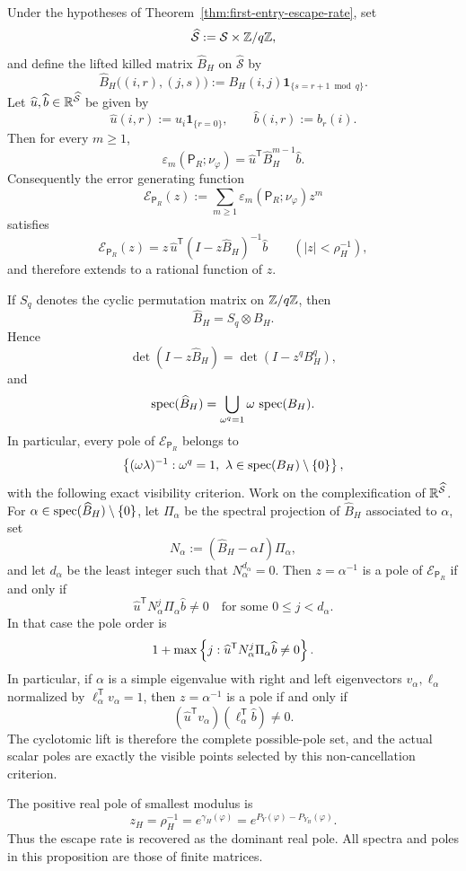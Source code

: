 \begin{proposition}
\label{thm:error-resolvent-cyclotomic}
\label{thm:main-resonance}
Under the hypotheses of
Theorem~\ref{thm:first-entry-escape-rate}, set
\[
  \widehat{\mathcal S}:=\mathcal S\times \mathbb{Z}/q\mathbb{Z},
\]
and define the lifted killed matrix \(\widehat B_H\) on
\(\widehat{\mathcal S}\) by
\[
  \widehat B_H\bigl((i,r),(j,s)\bigr)
  := B_H(i,j)\mathbf{1}_{\{s=r+1\bmod q\}}.
\]
Let \(\widehat u,\widehat b\in\mathbb{R}^{\widehat{\mathcal S}}\) be given by
\[
  \widehat u(i,r):=u_i\mathbf{1}_{\{r=0\}},
  \qquad
  \widehat b(i,r):=b_r(i).
\]
Then for every \(m\geq 1\),
\[
  \varepsilon_m(\mathsf{P}_R;\nu_\varphi)
  = \widehat u^{\mathsf T}\widehat B_H^{m-1}\widehat b.
\]
Consequently the error generating function
\[
  \mathcal E_{\mathsf{P}_R}(z)
  := \sum_{m\geq 1}
      \varepsilon_m(\mathsf{P}_R;\nu_\varphi)z^m
\]
satisfies
\[
  \mathcal E_{\mathsf{P}_R}(z)
  = z\,\widehat u^{\mathsf T}
      (I-z\widehat B_H)^{-1}\widehat b
  \qquad (|z|<\rho_H^{-1}),
\]
and therefore extends to a rational function of \(z\).

If \(S_q\) denotes the cyclic permutation matrix on \(\mathbb{Z}/q\mathbb{Z}\), then
\[
  \widehat B_H=S_q\otimes B_H.
\]
Hence
\[
  \det(I-z\widehat B_H)=\det(I-z^q B_H^q),
\]
and
\[
  \operatorname{spec}(\widehat B_H)
  = \bigcup_{\omega^q=1}\omega\,\operatorname{spec}(B_H).
\]
In particular, every pole of \(\mathcal E_{\mathsf{P}_R}\) belongs to
\[
  \left\{(\omega\lambda)^{-1}:
       \omega^q=1,\ \lambda\in\operatorname{spec}(B_H)\setminus\{0\}\right\},
\]
with the following exact visibility criterion.  Work on the
complexification of \(\mathbb{R}^{\widehat{\mathcal S}}\).  For
\(\alpha\in\operatorname{spec}(\widehat B_H)\setminus\{0\}\), let \(\Pi_\alpha\) be
the spectral projection of \(\widehat B_H\) associated to \(\alpha\), set
\[
  N_\alpha:=(\widehat B_H-\alpha I)\Pi_\alpha,
\]
and let \(d_\alpha\) be the least integer such that
\(N_\alpha^{d_\alpha}=0\).  Then \(z=\alpha^{-1}\) is a pole of
\(\mathcal E_{\mathsf{P}_R}\) if and only if
\[
  \widehat u^{\mathsf T}N_\alpha^j\Pi_\alpha\widehat b\neq 0
  \quad\text{for some }0\leq j<d_\alpha.
\]
In that case the pole order is
\[
  1+\max\left\{j:\widehat u^{\mathsf T}N_\alpha^j
             \Pi_\alpha\widehat b\neq0\right\}.
\]
In particular, if \(\alpha\) is a simple eigenvalue with right and left
eigenvectors \(v_\alpha,\ell_\alpha\) normalized by
\(\ell_\alpha^{\mathsf T}v_\alpha=1\), then \(z=\alpha^{-1}\) is a pole
if and only if
\[
  (\widehat u^{\mathsf T}v_\alpha)
  (\ell_\alpha^{\mathsf T}\widehat b)\neq0.
\]
The cyclotomic lift is therefore the complete possible-pole set, and the
actual scalar poles are exactly the visible points selected by this
non-cancellation criterion.

The positive real pole of smallest modulus is
\[
  z_H=\rho_H^{-1}
      =e^{\gamma_H(\varphi)}
      =e^{P_Y(\varphi)-P_{Y_H}(\varphi)}.
\]
Thus the escape rate is recovered as the dominant real pole.  All spectra
and poles in this proposition are those of finite matrices.
\end{proposition}

